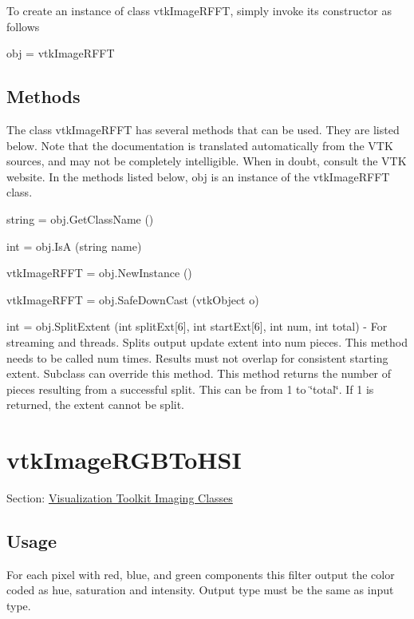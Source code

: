 To create an instance of class vtk\-Image\-R\-F\-F\-T, simply invoke its constructor as follows \begin{DoxyVerb}  obj = vtkImageRFFT
\end{DoxyVerb}
 \hypertarget{vtkwidgets_vtkxyplotwidget_Methods}{}\subsection{Methods}\label{vtkwidgets_vtkxyplotwidget_Methods}
The class vtk\-Image\-R\-F\-F\-T has several methods that can be used. They are listed below. Note that the documentation is translated automatically from the V\-T\-K sources, and may not be completely intelligible. When in doubt, consult the V\-T\-K website. In the methods listed below, {\ttfamily obj} is an instance of the vtk\-Image\-R\-F\-F\-T class. 
\begin{DoxyItemize}
\item {\ttfamily string = obj.\-Get\-Class\-Name ()}  
\item {\ttfamily int = obj.\-Is\-A (string name)}  
\item {\ttfamily vtk\-Image\-R\-F\-F\-T = obj.\-New\-Instance ()}  
\item {\ttfamily vtk\-Image\-R\-F\-F\-T = obj.\-Safe\-Down\-Cast (vtk\-Object o)}  
\item {\ttfamily int = obj.\-Split\-Extent (int split\-Ext\mbox{[}6\mbox{]}, int start\-Ext\mbox{[}6\mbox{]}, int num, int total)} -\/ For streaming and threads. Splits output update extent into num pieces. This method needs to be called num times. Results must not overlap for consistent starting extent. Subclass can override this method. This method returns the number of pieces resulting from a successful split. This can be from 1 to \char`\"{}total\char`\"{}. If 1 is returned, the extent cannot be split.  
\end{DoxyItemize}\hypertarget{vtkimaging_vtkimagergbtohsi}{}\section{vtk\-Image\-R\-G\-B\-To\-H\-S\-I}\label{vtkimaging_vtkimagergbtohsi}
Section\-: \hyperlink{sec_vtkimaging}{Visualization Toolkit Imaging Classes} \hypertarget{vtkwidgets_vtkxyplotwidget_Usage}{}\subsection{Usage}\label{vtkwidgets_vtkxyplotwidget_Usage}
For each pixel with red, blue, and green components this filter output the color coded as hue, saturation and intensity. Output type must be the same as input type.


